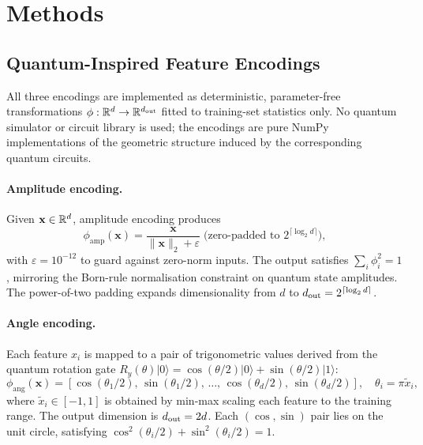 \section{Methods}
\label{sec:methods}

\subsection{Quantum-Inspired Feature Encodings}
\label{sec:encodings}

All three encodings are implemented as deterministic, parameter-free
transformations $\phi: \mathbb{R}^d \to \mathbb{R}^{d_{\mathrm{out}}}$ fitted to training-set
statistics only.
No quantum simulator or circuit library is used; the encodings are pure NumPy
implementations of the geometric structure induced by the corresponding
quantum circuits.

\paragraph{Amplitude encoding.}
Given $\mathbf{x} \in \mathbb{R}^d$, amplitude encoding produces
\begin{equation}
  \phi_{\mathrm{amp}}(\mathbf{x}) =
    \frac{\mathbf{x}}{\|\mathbf{x}\|_2 + \varepsilon}
    \;\text{(zero-padded to } 2^{\lceil\log_2 d\rceil}\text{)},
  \label{eq:amplitude}
\end{equation}
with $\varepsilon = 10^{-12}$ to guard against zero-norm inputs.
The output satisfies $\sum_i \phi_i^2 = 1$, mirroring the Born-rule
normalisation constraint on quantum state amplitudes.
The power-of-two padding expands dimensionality from $d$ to
$d_{\mathrm{out}} = 2^{\lceil\log_2 d\rceil}$.

\paragraph{Angle encoding.}
Each feature $x_i$ is mapped to a pair of trigonometric values derived from
the quantum rotation gate
$R_y(\theta)|0\rangle = \cos(\theta/2)|0\rangle + \sin(\theta/2)|1\rangle$:
\begin{equation}
  \phi_{\mathrm{ang}}(\mathbf{x}) =
  [\cos(\theta_1/2),\,\sin(\theta_1/2),\,\ldots,\,
   \cos(\theta_d/2),\,\sin(\theta_d/2)],
  \quad \theta_i = \pi \tilde{x}_i,
  \label{eq:angle}
\end{equation}
where $\tilde{x}_i \in [-1,1]$ is obtained by min-max scaling each feature to
the training range.
The output dimension is $d_{\mathrm{out}} = 2d$.
Each $(\cos,\sin)$ pair lies on the unit circle, satisfying
$\cos^2(\theta_i/2) + \sin^2(\theta_i/2) = 1$.

